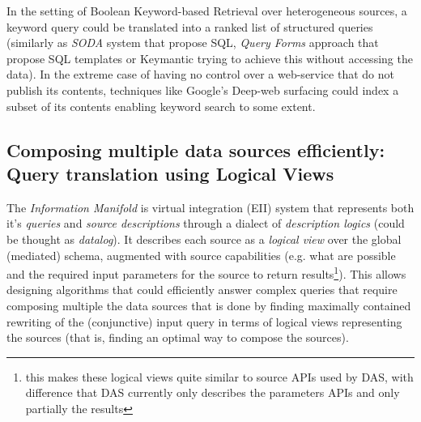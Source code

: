 In the setting of Boolean Keyword-based Retrieval over heterogeneous sources, a keyword query could be translated into a ranked list of structured queries (similarly as \textit{SODA} system that propose SQL, \textit{Query Forms} approach that propose SQL templates or Keymantic trying to achieve this without accessing the data).
In the extreme case of having no control over a web-service that do not publish its contents, techniques like Google's Deep-web surfacing could index a subset of its contents enabling keyword search to some extent.

\subsection{Composing multiple data sources efficiently: Query translation using Logical Views\label{IM_query_translation}}
The \textit{Information Manifold}\cite{Levy96} is virtual integration (EII) system that represents  both it's \textit{queries} and \textit{source descriptions} through a dialect of \textit{description logics} (could be thought as \textit{datalog}).  It describes each source as a \textit{logical view} over the global (mediated) schema, augmented with source capabilities (e.g. what are possible and the required input parameters for the source to return results\footnote{this makes these logical views quite similar to source APIs used by DAS, with difference that DAS currently only describes the parameters APIs and only partially the results}).
%
This allows designing algorithms that could efficiently answer complex queries that require composing multiple the data sources that is done by finding maximally contained rewriting of the (conjunctive) input query in terms of logical views representing the sources (that is, finding an optimal way to compose the sources).

